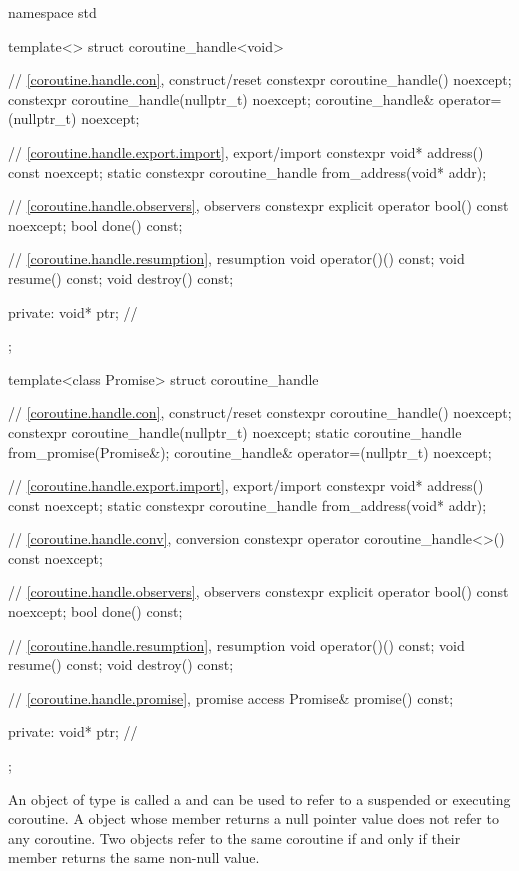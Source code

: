 %
\begin{codeblock}
namespace std {
  template<>
  struct coroutine_handle<void> {
    // \ref{coroutine.handle.con}, construct/reset
    constexpr coroutine_handle() noexcept;
    constexpr coroutine_handle(nullptr_t) noexcept;
    coroutine_handle& operator=(nullptr_t) noexcept;

    // \ref{coroutine.handle.export.import}, export/import
    constexpr void* address() const noexcept;
    static constexpr coroutine_handle from_address(void* addr);

    // \ref{coroutine.handle.observers}, observers
    constexpr explicit operator bool() const noexcept;
    bool done() const;

    // \ref{coroutine.handle.resumption}, resumption
    void operator()() const;
    void resume() const;
    void destroy() const;

  private:
    void* ptr;  // \expos
  };

  template<class Promise>
  struct coroutine_handle {
    // \ref{coroutine.handle.con}, construct/reset
    constexpr coroutine_handle() noexcept;
    constexpr coroutine_handle(nullptr_t) noexcept;
    static coroutine_handle from_promise(Promise&);
    coroutine_handle& operator=(nullptr_t) noexcept;

    // \ref{coroutine.handle.export.import}, export/import
    constexpr void* address() const noexcept;
    static constexpr coroutine_handle from_address(void* addr);

    // \ref{coroutine.handle.conv}, conversion
    constexpr operator coroutine_handle<>() const noexcept;

    // \ref{coroutine.handle.observers}, observers
    constexpr explicit operator bool() const noexcept;
    bool done() const;

    // \ref{coroutine.handle.resumption}, resumption
    void operator()() const;
    void resume() const;
    void destroy() const;

    // \ref{coroutine.handle.promise}, promise access
    Promise& promise() const;

  private:
    void* ptr;  // \expos
  };
}
\end{codeblock}

\pnum
An object of type
 is called a 
and can be used to refer to a suspended or executing coroutine.
A  object whose
member  returns a null pointer value
does not refer to any
coroutine.
Two  objects refer to the same coroutine
if and only if their member  returns the same non-null value.

